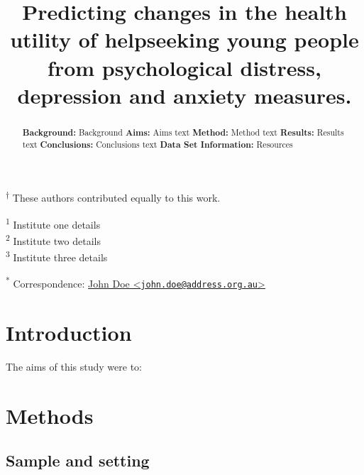 \documentclass{article}
\title{Predicting changes in the health utility of helpseeking young people from psychological distress, depression and anxiety measures.}
\author{
  }
\begin{document}
\maketitle


\begin{abstract}
\textbf{Background: } Background \newline \newline \textbf{Aims: } Aims text \newline \newline \textbf{Method: } Method text \newline \newline \textbf{Results: } Results text \newline \newline \textbf{Conclusions: } Conclusions text \newline \newline \textbf{Data Set Information:} Resources
\end{abstract}


\textsuperscript{$\dagger{}$} These authors contributed equally to this work.

\textsuperscript{1} Institute one details\\
\textsuperscript{2} Institute two details\\
\textsuperscript{3} Institute three details

\textsuperscript{*} Correspondence: \href{mailto:john.doe@address.org.au}{John Doe \textless{}\href{mailto:john.doe@address.org.au}{\nolinkurl{john.doe@address.org.au}}\textgreater{}}

\hypertarget{introduction}{%
\section{Introduction}\label{introduction}}

The aims of this study were to:

\hypertarget{methods}{%
\section{Methods}\label{methods}}

\hypertarget{sample-and-setting}{%
\subsection{Sample and setting}\label{sample-and-setting}}
\end{document}
